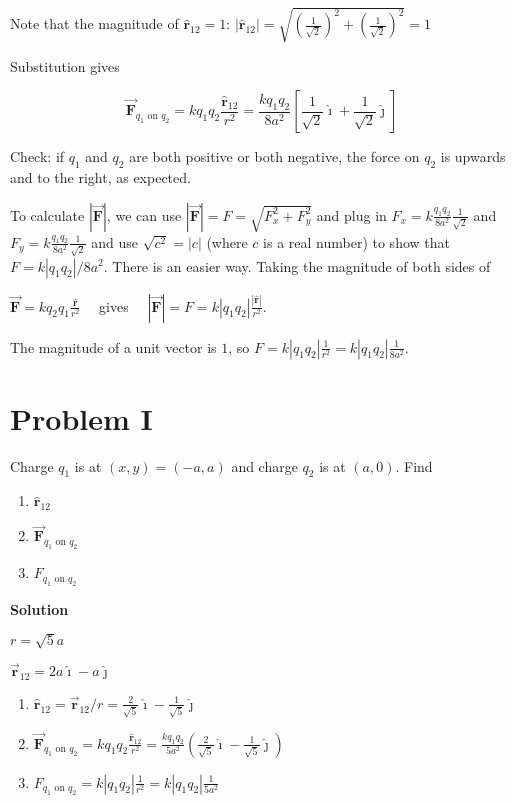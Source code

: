 \documentclass{article}
\newcommand{\ds}[0]{\displaystyle}
\newcommand{\ihat}[0]{\hat{\boldsymbol{\imath}}}
\newcommand{\jhat}[0]{\hat{\boldsymbol{\jmath}}}
\newcommand{\rhat}[0]{\hat{\mathbf{r}}}
\newcommand{\bfvec}[1]{\vec{\mathbf{#1}}}
\begin{document}
Note that the magnitude of $\rhat_{12}=1$: $\ds|\rhat_{12}|=\sqrt{\left(\frac{1}{\sqrt{2}}\right)^2+\left(\frac{1}{\sqrt{2}}\right)^2}=1$

Substitution gives

$$\bfvec{F}_{q_1\text{ on }q_2}=kq_1q_2\frac{\rhat_{12}}{r^2} = \frac{kq_1q_2}{8a^2}\left[\frac{1}{\sqrt{2}}\ihat + \frac{1}{\sqrt{2}}\jhat\right]$$

Check: if $q_1$ and $q_2$ are both positive or both negative, the force on $q_2$ is upwards and to the right, as expected.

To calculate $|\bfvec{F}|$, we can use $|\bfvec{F}|=F=\sqrt{F_x^2+F_y^2}$ and plug in $F_x=k\frac{q_1q_2}{8a^2}\frac{1}{\sqrt{2}}$ and $F_y=k\frac{q_1q_2}{8a^2}\frac{1}{\sqrt{2}}$ and use $\sqrt{c^2}=|c|$ (where $c$ is a real number) to show that $F=k|q_1q_2|/{8a^2}$. There is an easier way. Taking the magnitude of both sides of

$\ds\bfvec{F}=kq_2q_1\frac{\rhat}{r^2}\quad$
gives
$\quad\ds|\bfvec{F}|=F=k|q_1q_2|\frac{|\rhat|}{r^2}$.

The magnitude of a unit vector is $1$, so
$\ds F=k|q_1q_2|\frac{1}{r^2}=k|q_1q_2|\frac{1}{8a^2}$.

\newpage

\section{Problem I}

Charge $q_1$ is at $(x,y)=(-a,a)$ and charge $q_2$ is at $(a, 0)$. Find

\begin{enumerate}

  \item $\rhat_{12}$

  \item $\bfvec{F}_{q_1\text{ on }q_2}$

  \item $F_{q_1\text{ on }q_2}$

\end{enumerate}

\ifsolutions
\textbf{Solution}

$r = \sqrt{5}a$

$\bfvec{r}_{12}=2a\ihat-a\jhat$

    \begin{enumerate}

      \item $\ds\rhat_{12}=\bfvec{r}_{12}/r=\frac{2}{\sqrt{5}}\ihat-\frac{1}{\sqrt{5}}\jhat$

      \item $\ds\bfvec{F}_{q_1\text{ on }q_2}=kq_1q_2\frac{\rhat_{12}}{r^2}=\frac{kq_1q_2}{5a^2}\left(\frac{2}{\sqrt{5}}\ihat-\frac{1}{\sqrt{5}}\jhat\right)$

      \item $\ds F_{q_1\text{ on }q_2} = k|q_1q_2|\frac{1}{r^2}= k|q_1q_2|\frac{1}{5a^2}$

    \end{enumerate}
\else
\end{document}
